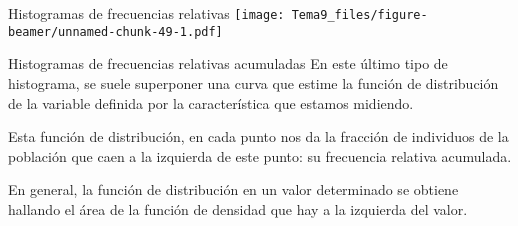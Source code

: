 \documentclass[
  ignorenonframetext,
]{beamer}
\begin{document}
\begin{frame}{Histogramas de frecuencias relativas}
\protect\hypertarget{histogramas-de-frecuencias-relativas-2}{}
\texttt{[image: Tema9\_files/figure-beamer/unnamed-chunk-49-1.pdf]}
\end{frame}

\begin{frame}{Histogramas de frecuencias relativas acumuladas}
\protect\hypertarget{histogramas-de-frecuencias-relativas-acumuladas}{}
En este último tipo de histograma, se suele superponer una curva que
estime la función de distribución de la variable definida por la
característica que estamos midiendo.

Esta función de distribución, en cada punto nos da la fracción de
individuos de la población que caen a la izquierda de este punto: su
frecuencia relativa acumulada.

En general, la función de distribución en un valor determinado se
obtiene hallando el área de la función de densidad que hay a la
izquierda del valor.
\end{frame}
\end{document}
